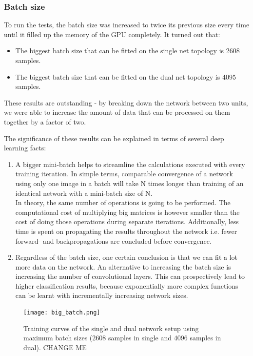 \documentclass[a4paper, 12pt]{article}
\numberwithin{equation}{section}
\begin{document}
	\subsubsection{Batch size}
		
	To run the tests, the batch size was increased to twice its previous size every time until it filled up the memory of the GPU completely. It turned out that:
	\begin{itemize}
		\item The biggest batch size that can be fitted on the single net topology is 2608 samples.
		\item The biggest batch size that can be fitted on the dual net topology is 4095 samples.
	\end{itemize}
	
	These results are outstanding - by breaking down the network between two units, we were able to increase the amount of data that can be processed on them together by a factor of two.
	
	The significance of these results can be explained in terms of several deep learning facts:
	\begin{enumerate}
		\item A bigger mini-batch helps to streamline the calculations executed with every training iteration. In simple terms, comparable convergence of a network using only one image in a batch will take N times longer than training of an identical network with a mini-batch size of N. \\ In theory, the same number of operations is going to be performed. The computational cost of multiplying big matrices is however smaller than the cost of doing those operations during separate iterations. Additionally, less time is spent on propagating the results throughout the network i.e. fewer forward- and backpropagations are concluded before convergence.
		\item Regardless of the batch size, one certain conclusion is that we can fit a lot more data on the network. An alternative to increasing the batch size is increasing the number of convolutional layers. This can prospectively lead to higher classification results, because exponentially more complex functions can be learnt with incrementally increasing network sizes.
	\end{enumerate}

	\begin{figure}[!h]
		\centering
		\texttt{[image: big\_batch.png]}
		\caption{\label{fig:big_batch}{Training curves of the single and dual network setup using maximum batch sizes (2608 samples in single and 4096 samples in dual). CHANGE ME}}
	\end{figure}
\end{document}

